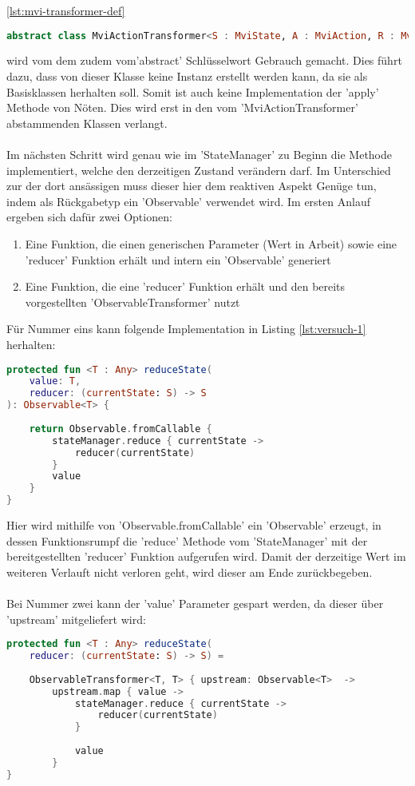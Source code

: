 \ref{lst:mvi-transformer-def}
\begin{lstlisting}[caption={MviActionTransformer Definition}, label={lst:mvi-transformer-def},
language=Kotlin]
abstract class MviActionTransformer<S : MviState, A : MviAction, R : MviResult> 
\end{lstlisting}
\bigskip
wird vom dem zudem vom'abstract' Schlüsselwort Gebrauch gemacht. Dies führt dazu, dass von dieser Klasse keine Instanz erstellt werden kann, da sie als Basisklassen herhalten soll. Somit ist auch keine Implementation der 'apply' Methode von Nöten. Dies wird erst in den vom 'MviActionTransformer' abstammenden Klassen verlangt.
\\\\
Im nächsten Schritt wird genau wie im 'StateManager' zu Beginn die Methode implementiert, welche den derzeitigen Zustand verändern darf. Im Unterschied zur der dort ansässigen muss dieser hier dem reaktiven Aspekt Genüge tun, indem als Rückgabetyp ein 'Observable' verwendet wird. Im ersten Anlauf ergeben sich dafür zwei Optionen:
\begin{enumerate}
	\item Eine Funktion, die einen generischen Parameter  (Wert in Arbeit) sowie eine 'reducer' Funktion erhält und intern ein 'Observable' generiert
	\item Eine Funktion, die eine 'reducer' Funktion erhält und den bereits vorgestellten 'ObservableTransformer' nutzt
\end{enumerate}
Für Nummer eins kann folgende Implementation in Listing
\ref{lst:versuch-1}
herhalten:
\begin{lstlisting}[caption={1. Versuch}, label={lst:versuch-1},language=Kotlin]
protected fun <T : Any> reduceState(
	value: T, 
	reducer: (currentState: S) -> S
): Observable<T> {
	
	return Observable.fromCallable {
		stateManager.reduce { currentState ->
			reducer(currentState)
		}
		value
	}
}
\end{lstlisting}
Hier wird mithilfe von 'Observable.fromCallable' ein 'Observable' erzeugt, in dessen Funktionsrumpf die 'reduce' Methode vom 'StateManager'  mit der bereitgestellten 'reducer' Funktion aufgerufen wird. Damit der derzeitige Wert im weiteren Verlauft nicht verloren geht, wird dieser am Ende zurückbegeben.
\\\\
Bei Nummer zwei kann der 'value' Parameter gespart werden, da dieser über 'upstream' mitgeliefert wird:
\begin{lstlisting}[caption={2. Versuch}, label={lst:versuch-2},language=Kotlin]
protected fun <T : Any> reduceState(
	reducer: (currentState: S) -> S) =
	
	ObservableTransformer<T, T> { upstream: Observable<T>  ->
		upstream.map { value ->
			stateManager.reduce { currentState ->
				reducer(currentState)
			}
		
			value
		}
}
\end{lstlisting}
